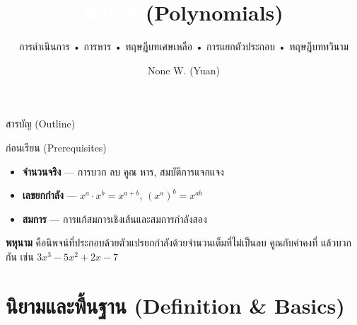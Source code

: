\documentclass[11pt, aspectratio=169]{beamer}
\title[พหุนาม]{\textcolor{white}{พหุนาม} \textcolor{boxBlue!60}{(Polynomials)}}
\subtitle{การดำเนินการ • การหาร • ทฤษฎีบทเศษเหลือ • การแยกตัวประกอบ • ทฤษฎีบททวินาม }
\author[None W. (Yuan)]{None W. (Yuan)}
\date{}
\begin{document}
\begin{frame}[plain]\titlepage\end{frame}\begin{frame}{สารบัญ (Outline)}\tableofcontents\end{frame}\begin{frame}{ก่อนเรียน (Prerequisites)}
  \begin{explanation}
    \begin{itemize}
      \item \textbf{จำนวนจริง} — การบวก ลบ คูณ หาร, สมบัติการแจกแจง
      \item \textbf{เลขยกกำลัง} — $x^a \cdot x^b = x^{a+b}$, $(x^a)^b = x^{ab}$
      \item \textbf{สมการ} — การแก้สมการเชิงเส้นและสมการกำลังสอง
    \end{itemize}
  \end{explanation}

  \begin{intuition}
    \textbf{พหุนาม} คือนิพจน์ที่ประกอบด้วยตัวแปรยกกำลังด้วยจำนวนเต็มที่ไม่เป็นลบ
    คูณกับค่าคงที่ แล้วบวกกัน เช่น $3x^3 - 5x^2 + 2x - 7$
  \end{intuition}
\end{frame}

\section{นิยามและพื้นฐาน (Definition \& Basics)}
\end{document}
